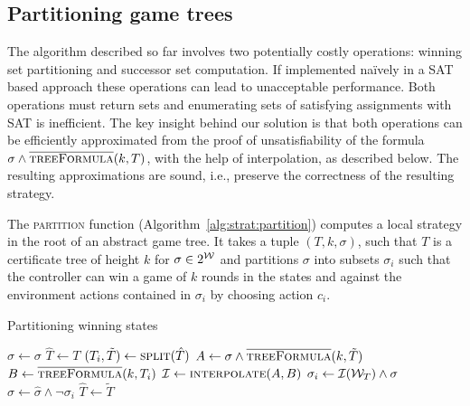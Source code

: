 \subsection{Partitioning game trees}

The algorithm described so far involves two potentially costly operations: winning set partitioning and successor set computation.  If implemented na\"ively in a SAT based approach these operations can lead to unacceptable performance. Both operations must return sets and enumerating sets of satisfying assignments with SAT is inefficient. The key insight behind our solution is that both operations can be efficiently approximated from the proof of unsatisfiability of the formula $\sigma \land \textsc{$\overline{\mbox{treeFormula}}$}(k, T)$, with the help of interpolation, as described below.  The resulting approximations are sound, i.e., preserve the correctness of the resulting strategy.

The \textsc{partition} function (Algorithm~\ref{alg:strat:partition}) computes a local strategy in the root of an abstract game tree.  It takes a tuple $(T, k, \sigma)$, such that $T$ is a certificate tree of height $k$ for $\sigma \in 2^{\mathcal{W}}$ and partitions $\sigma$ into subsets $\sigma_i$ such that the controller can win a game of $k$ rounds in the states and against the environment actions contained in $\sigma_i$ by choosing action $c_i$.

\begin{algorithm}[t]
   \caption{Partitioning winning states}\label{alg:strat:partition}
   \begin{algorithmic}[1]
        \State $\hat{\sigma} \gets \sigma$
        \State $\hat{T} \gets T$
        \State $(T_i, \tilde{T}) \gets \Call{split}{\hat{T}}$\label{alg:partition:split}
            \State $A \gets \sigma \land \Call{\opptf}{k, \tilde{T}} $ \label{alg:strat:partition:Bi}
            \State $B \gets \Call{\opptf}{k, T_i} $ \label{alg:strat:partition:Ai}
            \State $\mathcal{I} \gets \Call{interpolate}{A, B}$\label{alg:partition:I}
            \State $\sigma_i \gets \mathcal{I}(\mathcal{W}_T) \land \sigma$\label{alg:partition:Ii}
            \State $\hat{\sigma} \gets \hat{\sigma} \land \neg \sigma_i$
            \State $\hat{T} \gets \tilde{T}$\label{alg:partition:upd}
        \EndFor
        \State {} \label{alg:strat:partition:return}
        \EndFunction
    \end{algorithmic}
\end{algorithm}

